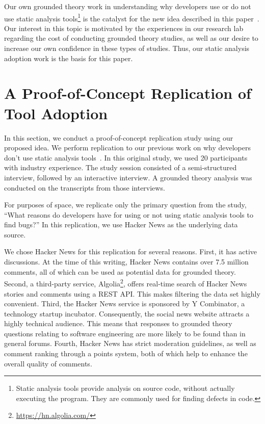 \documentclass{sig-alternate}
\begin{document}
Our own grounded theory work in understanding why developers use or do not use static analysis tools\footnote{Static analysis tools provide analysis on source code, without actually executing the program. They are commonly used for finding defects in code.} is the catalyst for the new idea described in this paper~\cite{Johnson2013a}. Our interest in this topic is motivated by the experiences in our research lab regarding the cost of conducting grounded theory studies, as well as our desire to increase our own confidence in these types of studies. Thus, our static analysis adoption work is the basis for this paper.

\section{A Proof-of-Concept Replication of Tool Adoption}

In this section, we conduct a proof-of-concept replication study using our proposed idea. We perform replication to our previous work on why developers don't use static analysis tools~\cite{Johnson2013a}. In this original study, we used 20 participants with industry experience. The study session consisted of a semi-structured interview, followed by an interactive interview. A grounded theory analysis was conducted on the transcripts from those interviews.

For purposes of space, we replicate only the primary question from the study, ``What reasons do developers have for using or not using static analysis tools to find bugs?'' In this replication, we use Hacker News as the underlying data source.

We chose Hacker News for this replication for several reasons. First, it has active discussions. At the time of this writing, Hacker News contains over 7.5 million comments, all of which can be used as potential data for grounded theory. Second, a third-party service, Algolia\footnote{\url{https://hn.algolia.com/}}, offers real-time search of Hacker News stories and comments using a REST API. This makes filtering the data set highly convenient. Third, the Hacker News service is sponsored by Y Combinator, a technology startup incubator. Consequently, the social news website attracts a highly technical audience. This means that responses to grounded theory questions relating to software engineering are more likely to be found than in general forums. Fourth, Hacker News has strict moderation guidelines, as well as comment ranking through a points system, both of which help to enhance the overall quality of comments. 
\end{document}
